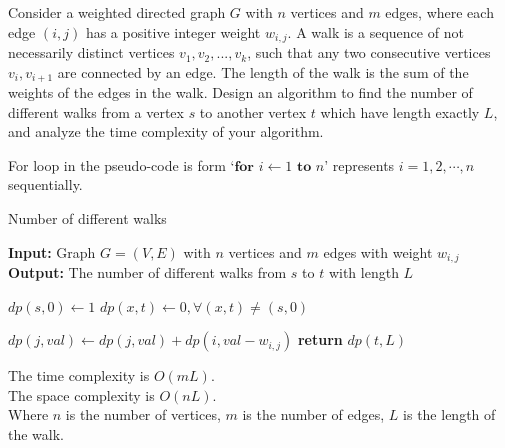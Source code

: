 \problem{}
Consider a weighted directed graph $G$ with $n$ vertices and $m$ edges, where each edge $(i,j)$ has a positive integer weight $w_{i, j}$. A  walk is a sequence of not necessarily distinct vertices $v_1, v_2, ..., v_k$, such that any two consecutive vertices $v_i, v_{i+1}$ are connected by an edge. The length of the walk is the sum of the weights of the edges in the walk.  Design an algorithm to find the number of different walks from a vertex $s$ to another vertex $t$ which have length exactly $L$, and analyze the time complexity of your algorithm. 

\solution{}





For loop in the pseudo-code is form `$\textbf{for } i \gets 1 \textbf{ to } n$' represents $i=1,2,\cdots,n$ sequentially.
\begin{algorithm}
    \caption{Number of different walks}\label{alg:problem-6}
    \begin{algorithmic}[1]
    \State \textbf{Input:} Graph $G=(V,E)$ with $n$ vertices and $m$ edges with weight $w_{i,j}$
    \State \textbf{Output:} The number of different walks from $s$ to $t$ with length $L$
    
    \State $dp(s,0) \gets 1$
    \State $dp(x,t) \gets 0, \forall (x,t)\neq (s,0)$
    
            \State $dp(j,val) \gets dp(j,val)+dp(i, val-w_{i,j})$
        \EndFor
    \EndFor
    \State \textbf{return} $dp(t,L)$
    \end{algorithmic}
\end{algorithm}

The time complexity is $O(mL)$.\\
The space complexity is $O(nL)$.\\
Where $n$ is the number of vertices, $m$ is the number of edges, $L$ is the length of the walk.\\